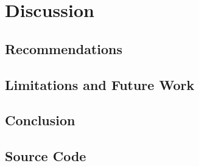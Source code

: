 \documentclass{thesis}
\begin{document}

\chapter{Discussion}
\todo{}

\section{Recommendations}
\section{Limitations and Future Work}
\section{Conclusion}


\begin{appendices}

\chapter{Source Code}

\end{appendices}



\renewcommand{\thechapter}{0} %

\end{document}
